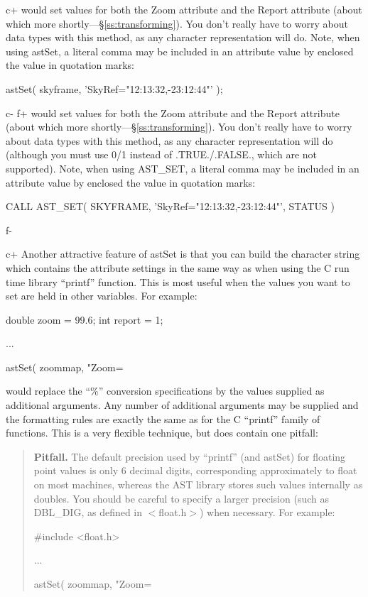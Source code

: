 \documentclass[twoside,11pt]{starlink}
\providecommand{\secref}[1]{\S\ref{#1}}
\begin{document}
c+
would set values for both the Zoom attribute and the Report attribute
(about which more shortly---\secref{ss:transforming}). You don't really
have to worry about data types with this method, as any character
representation will do. Note, when using astSet, a
literal comma may be included in an attribute value by enclosed the value in
quotation marks:
\small
\begin{terminalv}
      astSet( skyframe, 'SkyRef="12:13:32,-23:12:44"' );
\end{terminalv}
\normalsize
c-
f+
would set values for both the Zoom attribute and the Report attribute
(about which more shortly---\secref{ss:transforming}). You don't really
have to worry about data types with this method, as any character
representation will do (although you must use 0/1 instead of
.TRUE./.FALSE., which are not supported). Note, when using AST\_SET, a
literal comma may be included in an attribute value by enclosed the value in
quotation marks:
\small
\begin{terminalv}
      CALL AST_SET( SKYFRAME, 'SkyRef="12:13:32,-23:12:44"', STATUS )
\end{terminalv}
\normalsize
f-

c+
Another attractive feature of astSet is that you can build the
character string which contains the attribute settings in the same way
as when using the C run time library ``printf'' function. This is most
useful when the values you want to set are held in other
variables. For example:

\small
\begin{terminalv}
double zoom = 99.6;
int report = 1;

...

astSet( zoommap, "Zoom=%
\end{terminalv}
\normalsize

would replace the ``\%'' conversion specifications by the values
supplied as additional arguments. Any number of additional arguments
may be supplied and the formatting rules are exactly the same as for
the C ``printf'' family of functions. This is a very flexible
technique, but does contain one pitfall:

\begin{quote}
\textbf{Pitfall.} The default precision used by ``printf'' (and astSet)
for floating point values is only 6 decimal digits, corresponding
approximately to float on most machines, whereas the AST library
stores such values internally as doubles. You should be careful to
specify a larger precision (such as DBL\_DIG, as defined in
$<$float.h$>$) when necessary. For example:

\small
\begin{terminalv}
#include <float.h>

...

astSet( zoommap, "Zoom=%
\end{terminalv}
\normalsize
\end{quote}
\end{document}
